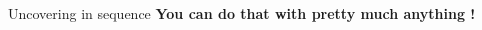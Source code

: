 \begin{frame}{Uncovering in sequence}
    \centering \textbf{You can do that with pretty much anything !} \\
    \begin{columns}  %
        \begin{column}{0.50\textwidth}
            \begin{center}

\end{center}
\end{column}
\end{columns}
\end{frame}
